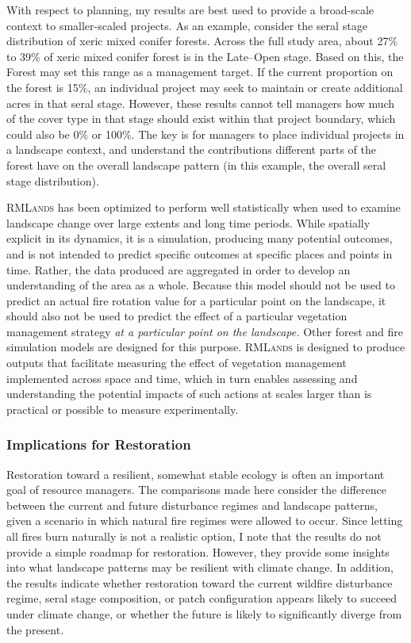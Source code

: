 With respect to planning, my results are best used to provide a broad-scale context to smaller-scaled projects. As an example, consider the seral stage distribution of xeric mixed conifer forests. Across the full study area, about 27\% to 39\% of xeric mixed conifer forest is in the Late--Open stage. Based on this, the Forest may set this range as a management target. If the current proportion on the forest is 15\%, an individual project may seek to maintain or create additional acres in that seral stage. However, these results cannot tell managers how much of the cover type in that stage should exist within that project boundary, which could also be 0\% or 100\%. The key is for managers to place individual projects in a landscape context, and understand the contributions different parts of the forest have on the overall landscape pattern (in this example, the overall seral stage distribution).

\textsc{RMLands} has been optimized to perform well statistically when used to examine landscape change over large extents and long time periods. While spatially explicit in its dynamics, it is a simulation, producing many potential outcomes, and is not intended to predict specific outcomes at specific places and points in time. Rather, the data produced are aggregated in order to develop an understanding of the area as a whole. Because this model should not be used to predict an actual fire rotation value for a particular point on the landscape, it should also not be used to predict the effect of a particular vegetation management strategy \emph{at a particular point on the landscape.} Other forest and fire simulation models are designed for this purpose. \textsc{RMLands} is designed to produce outputs that facilitate measuring the effect of vegetation management implemented across space and time, which in turn enables assessing and understanding the potential impacts of such actions at scales larger than is practical or possible to measure experimentally.  


\subsubsection*{Implications for Restoration}

Restoration toward a resilient, somewhat stable ecology is often an important goal of resource managers. The comparisons made here consider the difference between the current and future disturbance regimes and landscape patterns, given a scenario in which natural fire regimes were allowed to occur. Since letting all fires burn naturally is not a realistic option, I note that the results do not provide a simple roadmap for restoration. However, they provide some insights into what landscape patterns may be resilient with climate change. In addition, the results indicate whether restoration toward the current wildfire disturbance regime, seral stage composition, or patch configuration appears likely to succeed under climate change, or whether the future is likely to significantly diverge from the present. 

